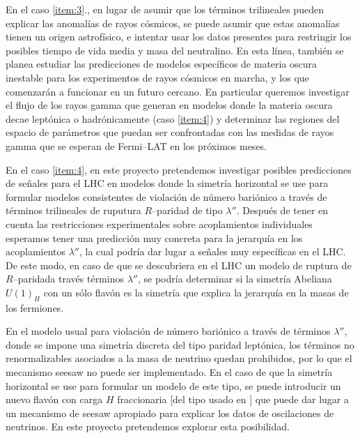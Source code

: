 \documentclass[11pt]{article}
\begin{document}
En el caso \ref{item:3}., en lugar de asumir que los términos trilineales pueden explicar las anomalías de rayos cósmicos, se puede asumir que estas anomalías tienen un origen astrofísico, e intentar usar los datos presentes para restringir los posibles tiempo de vida media y masa del neutralino. En esta línea, también se planea estudiar las predicciones de modelos específicos de materia oscura inestable para los experimentos de rayos cósmicos en marcha, y los que comenzarán a funcionar en un futuro cercano.  En particular queremos  investigar el flujo de los rayos gamma que generan en modelos donde la materia oscura decae leptónica  o hadrónicamente (caso \ref{item:4}) y determinar las regiones del espacio de parámetros que puedan ser confrontadas con las medidas de rayos gamma que se esperan de Fermi--LAT en los próximos meses.

En el caso \ref{item:4}, en este proyecto pretendemos investigar posibles predicciones de señales para el LHC en modelos donde la simetría horizontal se use para formular modelos consistentes de violación de número bariónico a través de términos trilineales de ruputura $R$--paridad de tipo $\lambda''$. Después de tener en cuenta las restricciones experimentales sobre acoplamientos individuales
esperamos tener una predicción muy concreta para la jerarquía en los acoplamientos $\lambda''$, la cual podría dar lugar a señales muy específicas en el LHC. De este modo, en caso de que se descubriera en el LHC un modelo de ruptura de $R$--paridada través términos $\lambda''$, se podría determinar si la simetría Abeliana  $U(1)_H$ con un sólo flavón es la simetría que explica la jerarquía en la masas de los fermiones.

En el modelo usual para violación de número bariónico a través de términos $\lambda''$, donde se impone  una simetría discreta del tipo paridad leptónica, los términos no renormalizables asociados a la masa de neutrino quedan prohibidos, por lo que el mecanismo seesaw no puede ser implementado. En el caso de que la simetría horizontal se use para formular un modelo de este tipo, se puede introducir un nuevo flavón con carga $H$ fraccionaria [del tipo usado en \cite{Chen:2008tc}] que puede dar lugar a un mecanismo de seesaw apropiado para explicar los datos de oscilaciones de neutrinos. En este proyecto pretendemos explorar esta posibilidad.
\end{document}
